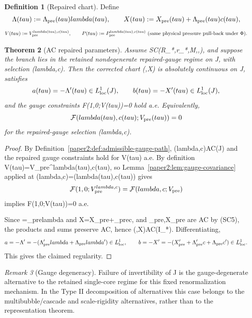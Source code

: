 \documentclass[11pt]{amsart}
\def\({}%
\def\){}%
\def\mathrm#1{#1}%
\def\tau{tau}%
\def\lambda{lambda}%
\theoremstyle{plain}
\newtheorem{theorem}{Theorem}[section]
\theoremstyle{definition}
\newtheorem{definition}[theorem]{Definition}
\theoremstyle{remark}
\newtheorem{remark}[theorem]{Remark}
\begin{document}
\begin{definition}[Repaired chart]\label{paper2:def:repaired-chart}
Define
\[
\Lambda(\tau):=\Lambda_{\rm pre}(\tau)\lambda(\tau),\qquad
X(\tau):=X_{\rm pre}(\tau)+\Lambda_{\rm pre}(\tau)c(\tau),
\]
\[
V(\tau):=V_{\rm pre}^{\lambda(\tau),c(\tau)},\qquad
P(\tau):=P_{\rm pre}^{\lambda(\tau),c(\tau)}\ \text{(same physical pressure pull-back under }\Phi).
\]
\end{definition}

\begin{theorem}[AC repaired parameters]\label{paper2:thm:repaired-existence}
Assume \(\mathrm{SC}(R_*,r_*,M,\eta,\kappa)\), and suppose the branch lies in the
retained nondegenerate repaired-gauge regime on \(J\), with selection
\((\lambda,c)\). Then the corrected
chart \((\Lambda,X)\) is absolutely continuous on \(J\), satisfies
\[
a(\tau)=-\Lambda'(\tau)\in L^1_{\rm loc}(J),\qquad
b(\tau)=-X'(\tau)\in L^1_{\rm loc}(J),
\]
and the gauge constraints \(\mathcal F(1,0;V(\tau))=0\) hold a.e.
Equivalently,
\[
\mathcal F(\lambda(\tau),c(\tau);V_{\rm pre}(\tau))=0
\]
for the repaired-gauge selection \((\lambda,c)\).
\end{theorem}
\begin{proof}
By Definition~\ref{paper2:def:admissible-gauge-path}, \((\lambda,c)\in AC(J)\) and the
repaired gauge constraints hold for \(V(\tau)\) a.e.
By definition \(V(\tau)=V_{\rm pre}^{\lambda(\tau),c(\tau)}\), so Lemma~\ref{paper2:lem:gauge-covariance}
applied at \((\lambda,c)=(\lambda(\tau),c(\tau))\) gives
\[
\mathcal F(1,0;V_{\rm pre}^{\lambda,c})=\mathcal F(\lambda,c;V_{\rm pre})
\]
implies \(\mathcal F(1,0;V(\tau))=0\) a.e.

Since \(\Lambda=\Lambda_{\rm pre}\lambda\) and \(X=X_{\rm pre}+\Lambda_{\rm pre}c\),
and \(\Lambda_{\rm pre},X_{\rm pre}\) are AC by \textup{(SC5)}, the products and sums
preserve AC, hence \((\Lambda,X)\in AC(I_*)\). Differentiating,
\[
a=-\Lambda' =-(\Lambda_{\rm pre}'\lambda+\Lambda_{\rm pre}\lambda')\in L^1_{\rm loc},\qquad
b=-X' =-(X_{\rm pre}'+\Lambda_{\rm pre}'c+\Lambda_{\rm pre}c')\in L^1_{\rm loc}.
\]
This gives the claimed regularity.
\end{proof}

\begin{remark}[Gauge degeneracy]
Failure of invertibility of \(J\) is the gauge-degenerate alternative to the
retained single-core regime for this fixed renormalization mechanism.  In the
Type II decomposition of alternatives this case belongs to the
multibubble/cascade and scale-rigidity alternatives, rather than to the
representation theorem.
\end{remark}
\end{document}
